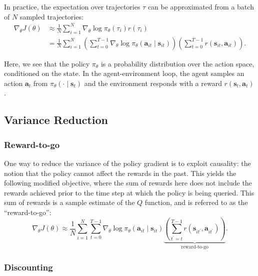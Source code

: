 \documentclass{article}
\def\rva{{\mathbf{a}}}
\def\rvs{{\mathbf{s}}}
\begin{document}
In practice, the expectation over trajectories $\tau$ can be approximated from a batch of $N$ sampled trajectories:
\begin{align}
    \nabla_{\theta} J(\theta) & \approx \frac{1}{N} \sum_{i=1}^{N} \nabla_{\theta} \log \pi_{\theta}\left(\tau_{i}\right) r\left(\tau_{i}\right) \nonumber \\
                                & =\frac{1}{N} \sum_{i=1}^{N}\left(\sum_{t=0}^{T-1} \nabla_{\theta} \log \pi_{\theta}\left(\rva_{i t} \mid \rvs_{i t}\right)\right)\left(\sum_{t=0}^{T-1} r\left(\rvs_{i t}, \rva_{i t}\right)\right). \label{eq:pg}
\end{align}

Here, we see that the policy $\pi_{\theta}$ is a probability distribution over the action space, conditioned on the state. In the agent-environment loop, the agent samples an action $\rva_{t}$ from $\pi_{\theta}\left(\cdot \mid \rvs_{t}\right)$ and the environment responds with a reward $r\left(\rvs_{t}, \rva_{t}\right)$.

\subsection{Variance Reduction}

\subsubsection{Reward-to-go}

One way to reduce the variance of the policy gradient is to exploit causality: the notion that the policy cannot affect the rewards in the past. This yields the following modified objective, where the sum of rewards here does not include the rewards achieved prior to the time step at which the policy is being queried. This sum of rewards is a sample estimate of the $Q$ function, and is referred to as the ``reward-to-go'':
\begin{equation} \label{eq:pg_rtg}
    \nabla_{\theta} J(\theta) \approx \frac{1}{N} \sum_{i=1}^{N} \sum_{t=0}^{T-1} \nabla_{\theta} \log \pi_{\theta}\left(\rva_{i t} \mid \rvs_{i t}\right)
    \underbrace{\left(
    \sum_{t^{\prime}=t}^{T-1} r\left(\rvs_{i t^{\prime}}, \rva_{i t^{\prime}}\right)
    \right)}_\textrm{reward-to-go}.
\end{equation}

\subsubsection{Discounting}
\end{document}
